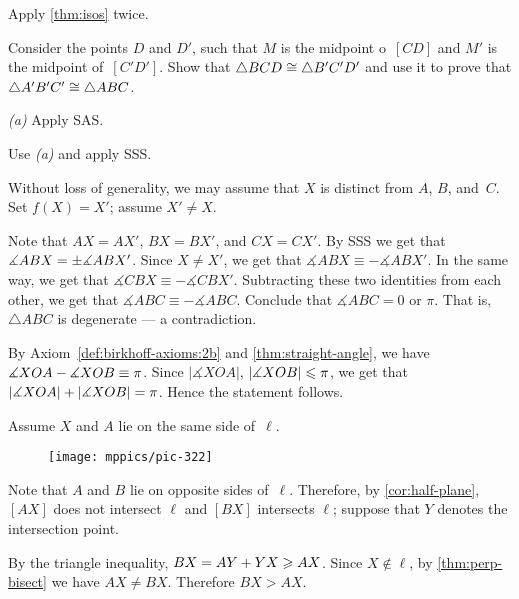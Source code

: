 \begin{multicols}{2}
Apply \ref{thm:isos} twice.

Consider the points $D$ and $D'$, such that 
$M$ is the midpoint o~$[CD]$
and 
$M'$ is the midpoint of~$[C'D']$.
Show that $\triangle BCD\z\cong \triangle B'C'D'$ and use it to prove that $\triangle A' B' C'\z\cong\triangle A B C$.

 \textit{(a)} Apply SAS.

 Use \textit{(a)} and apply SSS.

Without loss of generality, we may assume that $X$ is distinct from $A$, $B$, and~$C$.
Set $f(X)=X'$; assume $X'\ne X$.

Note that $AX=AX'$, $BX=BX'$, and $CX=CX'$.
By SSS we get that $\measuredangle ABX\z=\pm\measuredangle ABX'$.
Since $X\ne X'$, we get that
$\measuredangle ABX\equiv - \measuredangle ABX'$.
In the same way, we get that 
$\measuredangle CBX\equiv - \measuredangle CBX'$.
Subtracting these two identities from each other, we get that
$\measuredangle ABC\equiv -\measuredangle ABC$.
Conclude that $\measuredangle ABC=0$ or $\pi$.
That is, $\triangle ABC$ is degenerate --- a contradiction. 



\setcounter{eqtn}{0}


By Axiom~\ref{def:birkhoff-axioms:2b} and \ref{thm:straight-angle}, we have
$\measuredangle XOA\z-\measuredangle XOB\z\equiv\pi$.
Since $|\measuredangle XOA|$, $|\measuredangle XOB|\z\le \pi$, we get that
$|\measuredangle XOA|\z+|\measuredangle XOB|\z=\pi$.
Hence the statement follows. 

Assume $X$ and $A$ lie on the same side of~$\ell$.

\begin{wrapfigure}{r}{27mm}
\vskip-4mm
\centering
\texttt{[image: mppics/pic-322]}
\end{wrapfigure}

Note that $A$ and $B$ lie on opposite sides of~$\ell$.
Therefore, by \ref{cor:half-plane}, 
$[AX]$ does not intersect $\ell$ 
and $[BX]$ intersects $\ell$;
suppose that $Y$ denotes the intersection point.

By the triangle inequality, $BX=AY\z+YX\z\ge AX$.
Since $X\notin\ell$, by \ref{thm:perp-bisect} we have $AX\ne BX$.
Therefore $BX> AX$.


\end{multicols}

